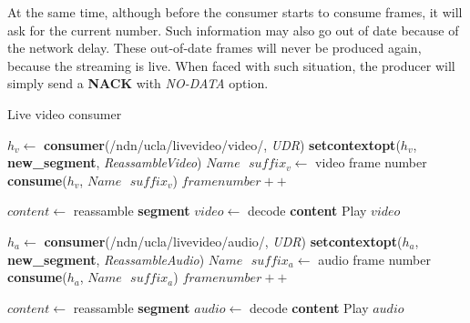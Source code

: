 At the same time, although before the consumer starts to consume frames, it will ask for the current number. Such information may also go out of date because of the network delay. These out-of-date frames will never be produced again, because the streaming is live. When faced with such situation, the producer will simply send a \textbf{NACK} with \textit{NO-DATA} option.

\begin{algorithm}[hbtp]
\caption{Live video consumer}
\label{alg:liveconsumer}
\begin{algorithmic}[2]
\State $h_v \leftarrow $ \textbf{consumer}(/ndn/ucla/livevideo/video/, \textit{UDR})
\State \textbf{setcontextopt}($h_v$, \textbf{new\_segment}, \textit{ReassambleVideo})
\vspace{0.2cm}
	\State $Name \textbf{ } suffix_v \leftarrow $ video frame number
	\State \textbf{consume}($h_v$, $Name\textbf{ }suffix_v$)
	\State $framenumber ++$
	\EndWhile
\vspace{0.2cm}

    \State $content \leftarrow $ reassamble \textbf{segment}
		\State $video \leftarrow $ decode \textbf{content}
	   	\State Play $video$
	\EndIf
\EndFunction

\vspace{0.4cm}

\State $h_a \leftarrow $ \textbf{consumer}(/ndn/ucla/livevideo/audio/, \textit{UDR})
\State \textbf{setcontextopt}($h_a$, \textbf{new\_segment}, \textit{ReassambleAudio})
\vspace{0.2cm}
	\State $Name \textbf{ } suffix_a \leftarrow $ audio frame number
	\State \textbf{consume}($h_a$, $Name\textbf{ }suffix_a$)
	\State $framenumber ++$
	\EndWhile
\vspace{0.2cm}

    \State $content \leftarrow $ reassamble \textbf{segment}
		\State $audio \leftarrow $ decode \textbf{content}
	   	\State Play $audio$
	\EndIf
\EndFunction
\end{algorithmic}
\end{algorithm}

